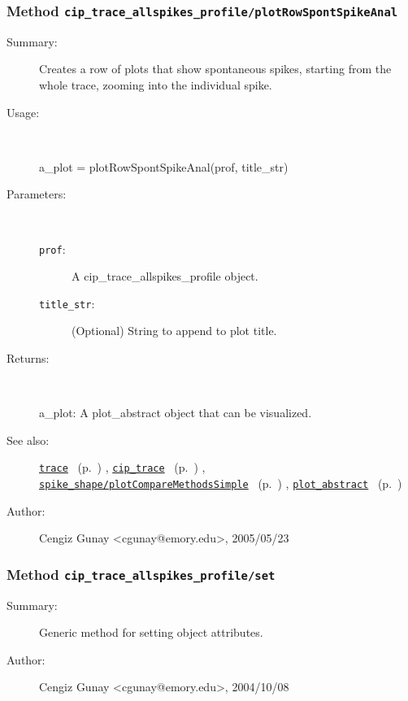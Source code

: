 \subsubsection[Method \texttt{plotRowSpontSpikeAnal}]{Method \texttt{cip\_trace\_allspikes\_profile/plotRowSpontSpikeAnal}}%
%
\label{ref_cip_trace_allspikes_profile__plotRowSpontSpikeAnal}%
\hypertarget{ref_cip_trace_allspikes_profile__plotRowSpontSpikeAnal}{}%
\begin{description}
\item[Summary:]Creates a row of plots that show spontaneous spikes, starting from the whole trace, zooming into the individual spike.
%
\item[Usage:]~%
\begin{lyxcode}%
a\_plot = plotRowSpontSpikeAnal(prof, title\_str)
%
\end{lyxcode}%
%
%
\item[Parameters:]~
\begin{description}%
\item[\texttt{prof}:]
 A cip\_trace\_allspikes\_profile object.
\item[\texttt{title\_str}:]
 (Optional) String to append to plot title.
\end{description}%
%
\item[Returns:
]~

	a\_plot: A plot\_abstract object that can be visualized.
%
%
\item[See also:]%
\hyperlink{ref_trace}{\texttt{trace}}%
\ (p.~\pageref{ref_trace})%
%
, \hyperlink{ref_cip_trace}{\texttt{cip\_trace}}%
\ (p.~\pageref{ref_cip_trace})%
%
, \hyperlink{ref_spike_shape__plotCompareMethodsSimple}{\texttt{spike\_shape/plotCompareMethodsSimple}}%
\ (p.~\pageref{ref_spike_shape__plotCompareMethodsSimple})%
%
, \hyperlink{ref_plot_abstract}{\texttt{plot\_abstract}}%
\ (p.~\pageref{ref_plot_abstract})%
%
%
\item[Author:]%
Cengiz Gunay <cgunay@emory.edu>, 2005/05/23
%
\end{description}
\methodline%
\subsubsection[Method \texttt{set}]{Method \texttt{cip\_trace\_allspikes\_profile/set}}%
%
\label{ref_cip_trace_allspikes_profile__set}%
\hypertarget{ref_cip_trace_allspikes_profile__set}{}%
\begin{description}
\item[Summary:]Generic method for setting object attributes.
%
%
%
%
%
%
%
\item[Author:]%
Cengiz Gunay <cgunay@emory.edu>, 2004/10/08
%
\end{description}
\methodline%
